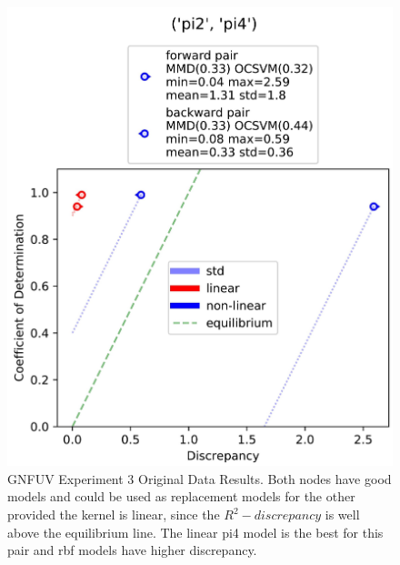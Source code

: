 \documentclass{mpaper}
\begin{document}
\begin{figure}
    \begin{center}
        \includegraphics[scale = 0.09]{experiment_3.jpg}
    \end{center}
    \caption{GNFUV Experiment 3 Original Data Results. Both nodes have good models and could be used as replacement models for the other provided the kernel is linear, since the $R^2-discrepancy$ is well above the equilibrium line. The linear pi4 model is the best for this pair and rbf models have higher discrepancy.}
    \label{fig:gnfuv_exp3}
\end{figure}
\end{document}
